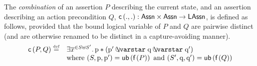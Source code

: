 \begin{definition}[Combination]
The \emph{combination} of an assertion $P$ describing the current state, and an assertion describing an action precondition $Q$, $\textsf{c}\left(., .\right): \textsf{Assn} \times \textsf{Assn} \rightarrow \textsf{LAssn}$, is defined as follows, provided that the bound logical variable of $P$ and $Q$ are pairwise distinct (and are otherwise renamed to be distinct in a capture-avoiding manner).
%
\[
\begin{array}{l l l}
	\combine{P}{Q} \eqdef & \exsts{\overline{x}^{\in S \uplus S'}} \lass{P} * (\lass{P}' \sepish \lass{Q} \sepish \lass{Q}')\\
	& \text{where } (S, \lass{P}, \lass{P}') = \ub{\un{P}} \text{ and }  (S', \lass{Q}, \lass{Q}') = \ub{\un{Q}} 
\end{array}
\]
%
\end{definition}
%
%

